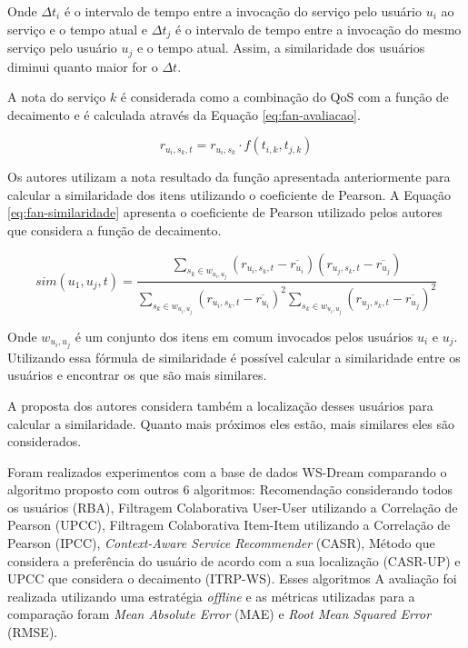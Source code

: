 Onde $\Delta t_i$ é o intervalo de tempo entre a invocação do serviço pelo usuário $u_i$ ao serviço e o tempo atual e
$\Delta t_j$ é o intervalo de tempo entre a invocação do mesmo serviço pelo usuário $u_j$ e o tempo atual. Assim, a
similaridade dos usuários  diminui quanto maior for o $\Delta t$.

A nota do serviço $k$ é considerada como a combinação do QoS com a função de decaimento e é calculada através da Equação \ref{eq:fan-avaliacao}.

\begin{equation}
  \label{eq:fan-avaliacao}
  r_{u_i, s_k, t} = r_{u_i, s_k} \cdot f(t_{i,k}, t_{j,k})
\end{equation}

Os autores utilizam a nota resultado da função apresentada anteriormente para calcular a similaridade dos itens utilizando
o coeficiente de Pearson. A Equação \ref{eq:fan-similaridade} apresenta o coeficiente de Pearson utilizado pelos autores
que considera a função de decaimento.

\begin{equation}
  \label{eq:fan-similaridade}
  sim(u_1, u_j, t) = \frac{\sum_{s_k \in w_{u_i, u_j}}{(r_{u_i, s_k, t} - \overline{r_{u_i}})(r_{u_j, s_k, t} - \overline{r_{u_j}})}}{\sum_{s_k \in w_{u_i, u_j}}{(r_{u_i, s_k, t} - \overline{r_{u_i}})}^2 \sum_{s_k \in w_{u_i, u_j}}{(r_{u_j, s_k, t} - \overline{r_{u_j}})}^2}
\end{equation}

Onde $w_{u_i, u_j}$ é um conjunto dos itens em comum invocados pelos usuários $u_i$ e $u_j$. Utilizando essa fórmula de
similaridade é possível calcular a similaridade entre os usuários e encontrar os que são mais similares.

A proposta dos autores considera também a localização desses usuários para calcular a similaridade. Quanto mais próximos
eles estão, mais similares eles são considerados.

Foram realizados experimentos com a base de dados WS-Dream comparando o algoritmo proposto com outros 6 algoritmos: Recomendação
considerando todos os usuários (RBA), Filtragem Colaborativa User-User utilizando a Correlação de Pearson (UPCC),
Filtragem Colaborativa Item-Item utilizando a Correlação de Pearson (IPCC), \textit{Context-Aware Service Recommender}
(CASR), Método que considera a preferência do usuário de acordo com a sua localização (CASR-UP) e UPCC que considera o decaimento (ITRP-WS). Esses algoritmos
A avaliação foi realizada utilizando uma estratégia \textit{offline} e as métricas utilizadas para a comparação foram
\textit{Mean Absolute Error} (MAE) e \textit{Root Mean Squared Error} (RMSE).

